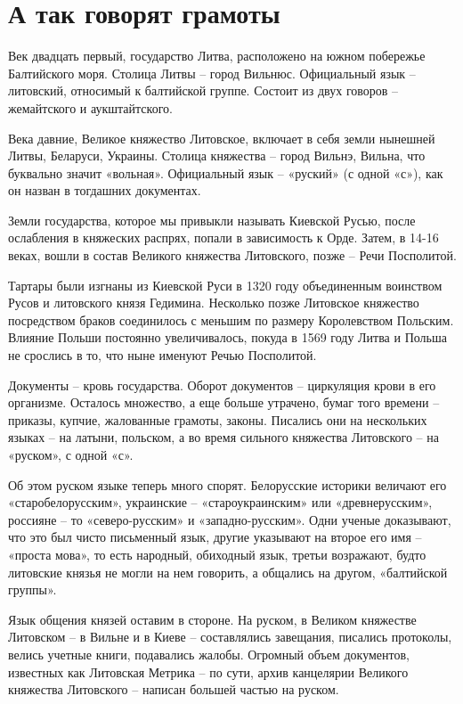 \chapter{А так говорят грамоты}

Век двадцать первый, государство Литва, расположено на южном побережье Балтийского моря. Столица Литвы – город Вильнюс. Официальный язык – литовский, относимый к балтийской группе. Состоит из двух говоров – жемайтского и аукштайтского.

Века давние, Великое княжество Литовское, включает в себя земли нынешней Литвы, Беларуси, Украины. Столица княжества – город Вильнэ, Вильна, что буквально значит «вольная». Официальный язык – «руский» (с одной «с»), как он назван в тогдашних документах.

Земли государства, которое мы привыкли называть Киевской Русью, после ослабления в княжеских распрях, попали в зависимость к Орде. Затем, в 14-16 веках, вошли в состав Великого княжества Литовского, позже – Речи Посполитой.

Тартары были изгнаны из Киевской Руси в 1320 году объединенным воинством Русов и литовского князя Гедимина. Несколько позже Литовское княжество посредством браков соединилось с меньшим по размеру Королевством Польским. Влияние Польши постоянно увеличивалось, покуда в 1569 году Литва и Польша не срослись в то, что ныне именуют Речью Посполитой.

Документы – кровь государства. Оборот документов – циркуляция крови в его организме. Осталось множество, а еще больше утрачено, бумаг того времени – приказы, купчие, жалованные грамоты, законы. Писались они на нескольких языках – на латыни, польском, а во время сильного княжества Литовского – на «руском», с одной «с».

Об этом руском языке теперь много спорят. Белорусские историки величают его «старобелорусским», украинские – «староукраинским» или «древнерусским», россияне – то «северо-русским» и «западно-русским». Одни ученые доказывают, что это был чисто письменный язык, другие указывают на второе его имя – «проста мова», то есть народный, обиходный язык, третьи возражают, будто литовские князья не могли на нем говорить, а общались на другом, «балтийской группы».

Язык общения князей оставим в стороне. На руском, в Великом княжестве Литовском – в Вильне и в Киеве – составлялись завещания, писались протоколы, велись учетные книги, подавались жалобы. Огромный объем документов, известных как Литовская Метрика – по сути, архив канцелярии Великого княжества Литовского – написан большей частью на руском.

